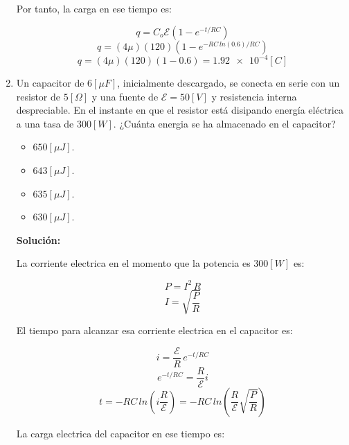 \documentclass[letter,11pt]{article}
\begin{document}
\begin{enumerate}
Por tanto, la carga en ese tiempo es:

\begin{equation*}
    q = C_o\mathcal{E} (1-e^{-t/RC})
\end{equation*}
\begin{equation*}
    q = (4\mu)(120) (1-e^{-RC\,ln(0.6)/RC})
\end{equation*}
\begin{equation*}
    q = (4\mu)(120) (1-0.6) = \num{1.92e-4} [C]
\end{equation*}

\item Un capacitor de $6 [\mu F]$, inicialmente descargado, se conecta en serie
con un resistor de $5 [\Omega]$ y una fuente de $\mathcal{E} = 50 [V]$ y
resistencia interna despreciable. En el instante en que el resistor está
disipando energía eléctrica a una tasa de $300 [W]$. ¿Cuánta energia se ha
almacenado en el capacitor?

\begin{itemize}
    \item $650 [\mu J]$.
    \item $643 [\mu J]$.
    \item $635 [\mu J]$.
    \item $630 [\mu J]$.
\end{itemize}

\textbf{Solución:}

La corriente electrica en el momento que la potencia es $300 [W]$ es:

\begin{equation*}
    P = I^2\,R
\end{equation*}
\begin{equation*}
    I = \sqrt{\frac{P}{R}}
\end{equation*}

El tiempo para alcanzar esa corriente electrica en el capacitor es:

\begin{equation*}
    i = \frac{\mathcal{E}}{R}\,e^{-t/RC}
\end{equation*}
\begin{equation*}
    e^{-t/RC} = \frac{R}{\mathcal{E}}i
\end{equation*}
\begin{equation*}
    t = -RC\,ln\left(i\frac{R}{\mathcal{E}}\right)
      = -RC\,ln\left(\frac{R}{\mathcal{E}}\sqrt{\frac{P}{R}}\right)
\end{equation*}

La carga electrica del capacitor en ese tiempo es:


\end{enumerate}
\end{document}
